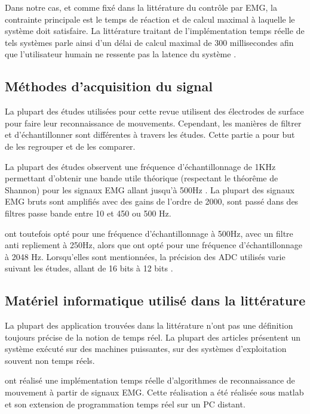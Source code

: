 \documentclass[letterpaper, twoside, 12pt, memoire, creativecommons, hyperref]{thETS}
\begin{document}
Dans notre cas, et comme fixé dans la littérature du contrôle par EMG, la contrainte principale est le temps de réaction et de calcul maximal à laquelle le système doit satisfaire. La littérature traitant de l’implémentation temps réelle de tels systèmes parle ainsi d’un délai de calcul maximal de 300 millisecondes afin que l’utilisateur humain ne ressente pas la latence du système \citep{Chu2007, Englehart2003}.

\subsection{Méthodes d'acquisition du signal}

La plupart des études utilisées pour cette revue utilisent des électrodes de surface pour faire leur reconnaissance de mouvements. Cependant, les manières de filtrer et d'échantillonner sont différentes à travers les études. Cette partie a pour but de les regrouper et de les comparer. 

La plupart des études observent une fréquence d’échantillonnage de 1KHz permettant d’obtenir une bande utile théorique (respectant le théorême de Shannon) pour les signaux EMG allant jusqu’à 500Hz \citep{Chang1996, Chu2007, Englehart2003, Tenore2007}. 
La plupart des signaux EMG bruts sont amplifiés avec des gains de l’ordre de 2000, sont passé dans des filtres passe bande entre 10 et 450 ou 500 Hz.

\cite{Peleg2002} ont toutefois opté pour une fréquence d’échantillonnage à 500Hz, avec un filtre anti repliement à 250Hz, alors que \cite{Crawford2005} ont opté pour une fréquence d’échantillonnage à 2048 Hz.
Lorsqu’elles sont mentionnées, la précision des ADC utilisés varie suivant les études, allant de 16 bits \citep{Englehart2003} à 12 bits \citep{Tenore2007, Fukuda2003, Prasad1996}.


\subsection{Matériel informatique utilisé dans la littérature}

La plupart des application trouvées dans la littérature n'ont pas une définition toujours précise de la notion de temps réel. La plupart des articles présentent un système exécuté sur des machines puissantes, sur des systèmes d'exploitation souvent non temps réels. 

\cite{Englehart2003} ont réalisé une implémentation temps réelle d’algorithmes de reconnaissance de mouvement à partir de signaux EMG. Cette réalisation a été réalisée sous matlab et son extension de programmation temps réel sur un PC distant.
\end{document}
